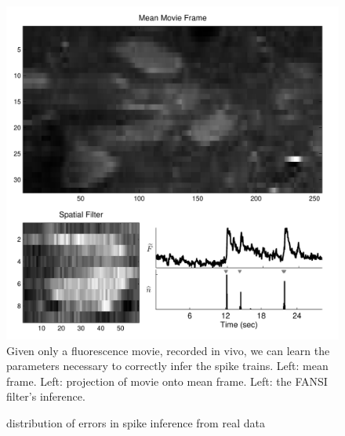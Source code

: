 
\begin{figure}[H]
\centering \includegraphics[width=.9\linewidth]{../figs/spatial_data}
\caption{Given only a fluorescence movie, recorded in vivo, we can learn the parameters necessary to correctly infer the spike trains. Left: mean frame.  Left: projection of movie onto mean frame. Left: the FANSI filter's inference.} \label{fig:spatial_data}
\end{figure}

\begin{figure}[H]
\caption{distribution of errors in spike inference from real data} \label{fig:err}
\end{figure}


